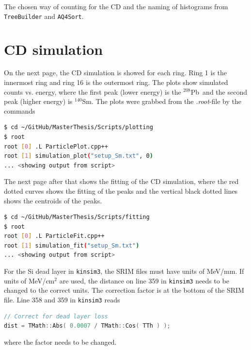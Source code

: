 \documentclass[twoside,english]{uiofysmaster/uiofysmaster}
\newcommand{\Sm}{$^{140}$Sm} %
\newcommand{\Pb}{$^{208}$Pb}
\begin{document}
\begin{appendices}
\begin{table}[ht] 
	\centering 
	\caption{The chosen way of counting for the CD and the naming of histograms from \texttt{TreeBuilder} and \texttt{AQ4Sort}.}
	
	\label{tab:TBvsAQ4}
\end{table}





\chapter{CD simulation}\label{ch:cd_sim}
On the next page, the CD simulation is showed for each ring. Ring 1 is the innermost ring and ring 16 is the outermost ring. The plots show simulated counts vs. energy, where the first peak (lower energy) is the \Pb\ and the second peak (higher energy) is \Sm. The plots were grabbed from the \textit{.root}-file by the commands

\begin{lstlisting}[language=sh]
$ cd ~/GitHub/MasterThesis/Scripts/plotting
$ root
root [0] .L ParticlePlot.cpp++
root [1] simulation_plot("setup_Sm.txt", 0)
... <showing output from script>
\end{lstlisting}

The next page after that shows the fitting of the CD simulation, where the red dotted curves shows the fitting of the peaks and the vertical black dotted lines shows the centroids of the peaks.

\begin{lstlisting}[language=sh]
$ cd ~/GitHub/MasterThesis/Scripts/fitting
$ root
root [0] .L ParticleFit.cpp++
root [1] simulation_fit("setup_Sm.txt")
... <showing output from script>
\end{lstlisting}

For the Si dead layer in \texttt{kinsim3}, the SRIM files must have units of MeV/mm. 
If units of MeV/cm$^2$ are used, the distance on line 359 in \texttt{kinsim3} needs to be changed to the correct units. 
The correction factor is at the bottom of the SRIM file.
Line 358 and 359 in \texttt{kinsim3} reads
\begin{lstlisting}[language=c++]
// Correct for dead layer loss
dist = TMath::Abs( 0.0007 / TMath::Cos( TTh ) );
\end{lstlisting}
where the factor needs to be changed.







\end{appendices}
\end{document}
